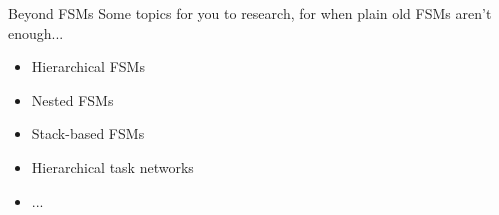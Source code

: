 \begin{frame}{Beyond FSMs}
    Some topics for you to research, for when plain old FSMs aren't enough... \pause
    \begin{itemize}
        \item Hierarchical FSMs
        \item Nested FSMs
        \item Stack-based FSMs
        \item Hierarchical task networks
        \item ...
    \end{itemize}
\end{frame}
